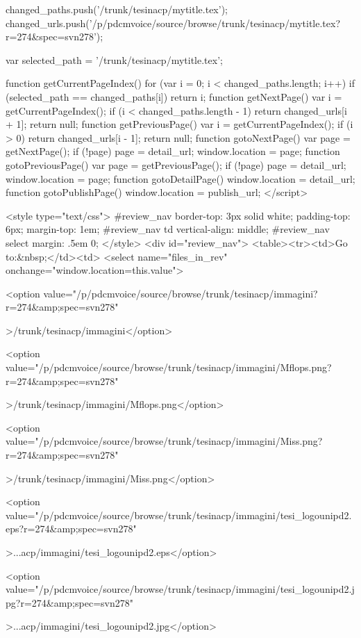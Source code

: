  
 changed_paths.push('/trunk/tesinacp/mytitle.tex');
 changed_urls.push('/p/pdcmvoice/source/browse/trunk/tesinacp/mytitle.tex?r=274&spec=svn278');
 
 var selected_path = '/trunk/tesinacp/mytitle.tex';
 
 
 function getCurrentPageIndex() {
 for (var i = 0; i < changed_paths.length; i++) {
 if (selected_path == changed_paths[i]) {
 return i;
 }
 }
 }
 function getNextPage() {
 var i = getCurrentPageIndex();
 if (i < changed_paths.length - 1) {
 return changed_urls[i + 1];
 }
 return null;
 }
 function getPreviousPage() {
 var i = getCurrentPageIndex();
 if (i > 0) {
 return changed_urls[i - 1];
 }
 return null;
 }
 function gotoNextPage() {
 var page = getNextPage();
 if (!page) {
 page = detail_url;
 }
 window.location = page;
 }
 function gotoPreviousPage() {
 var page = getPreviousPage();
 if (!page) {
 page = detail_url;
 }
 window.location = page;
 }
 function gotoDetailPage() {
 window.location = detail_url;
 }
 function gotoPublishPage() {
 window.location = publish_url;
 }
</script>
 
 <style type="text/css">
 #review_nav {
 border-top: 3px solid white;
 padding-top: 6px;
 margin-top: 1em;
 }
 #review_nav td {
 vertical-align: middle;
 }
 #review_nav select {
 margin: .5em 0;
 }
 </style>
 <div id="review_nav">
 <table><tr><td>Go to:&nbsp;</td><td>
 <select name="files_in_rev" onchange="window.location=this.value">
 
 <option value="/p/pdcmvoice/source/browse/trunk/tesinacp/immagini?r=274&amp;spec=svn278"
 
 >/trunk/tesinacp/immagini</option>
 
 <option value="/p/pdcmvoice/source/browse/trunk/tesinacp/immagini/Mflops.png?r=274&amp;spec=svn278"
 
 >/trunk/tesinacp/immagini/Mflops.png</option>
 
 <option value="/p/pdcmvoice/source/browse/trunk/tesinacp/immagini/Miss.png?r=274&amp;spec=svn278"
 
 >/trunk/tesinacp/immagini/Miss.png</option>
 
 <option value="/p/pdcmvoice/source/browse/trunk/tesinacp/immagini/tesi_logounipd2.eps?r=274&amp;spec=svn278"
 
 >...acp/immagini/tesi_logounipd2.eps</option>
 
 <option value="/p/pdcmvoice/source/browse/trunk/tesinacp/immagini/tesi_logounipd2.jpg?r=274&amp;spec=svn278"
 
 >...acp/immagini/tesi_logounipd2.jpg</option>
 
